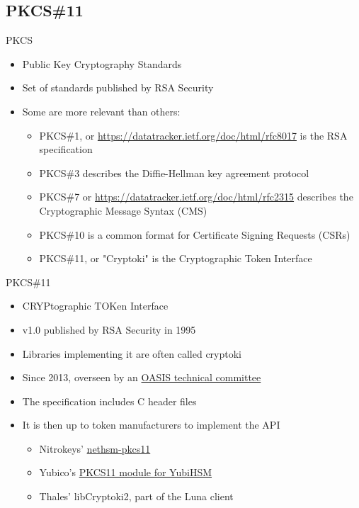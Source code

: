 
\subsection{PKCS\#11}

\begin{frame}{PKCS}
  \begin{itemize}
    \item Public Key Cryptography Standards
    \item Set of standards published by RSA Security
    \item Some are more relevant than others:
    \begin{itemize}
      \item PKCS\#1, or \href{RFC 8017}{https://datatracker.ietf.org/doc/html/rfc8017}
            is the RSA specification
      \item PKCS\#3 describes the Diffie-Hellman key agreement protocol
      \item PKCS\#7 or \href{RFC 2315}{https://datatracker.ietf.org/doc/html/rfc2315}
            describes the Cryptographic Message Syntax (CMS)
      \item PKCS\#10 is a common format for Certificate Signing Requests (CSRs)
      \item PKCS\#11, or "Cryptoki" is the Cryptographic Token Interface
    \end{itemize}
  \end{itemize}
\end{frame}

\begin{frame}{PKCS\#11}
  \begin{itemize}
    \item CRYPtographic TOKen Interface
    \item v1.0 published by RSA Security in 1995
    \item Libraries implementing it are often called cryptoki
    \item Since 2013, overseen by an \href{https://www.oasis-open.org/committees/tc_home.php?wg_abbrev=pkcs11}{OASIS technical committee}
    \item The specification includes C header files
    \item It is then up to token manufacturers to implement the API
    \begin{itemize}
      \item Nitrokeys' \href{https://github.com/Nitrokey/nethsm-pkcs11}{nethsm-pkcs11}
      \item Yubico's \href{https://developers.yubico.com/yubihsm-shell/yubihsm-pkcs11.html}{PKCS11 module for YubiHSM}
      \item Thales' libCryptoki2, part of the Luna client
    \end{itemize}
  \end{itemize}
\end{frame}


